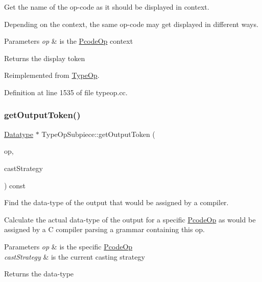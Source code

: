 Get the name of the op-\/code as it should be displayed in context. 

Depending on the context, the same op-\/code may get displayed in different ways. 
\begin{DoxyParams}{Parameters}
{\em op} & is the \mbox{\hyperlink{class_pcode_op}{Pcode\+Op}} context \\
\hline
\end{DoxyParams}
\begin{DoxyReturn}{Returns}
the display token 
\end{DoxyReturn}


Reimplemented from \mbox{\hyperlink{class_type_op_a42a1ffa77f998df24efdb44405b33ac5}{Type\+Op}}.



Definition at line 1535 of file typeop.\+cc.

\mbox{\label{class_type_op_subpiece_ac93ca300b551f16888008869eca39150}} 
\subsubsection{\texorpdfstring{getOutputToken()}{getOutputToken()}}
{\footnotesize\ttfamily \mbox{\hyperlink{class_datatype}{Datatype}} $\ast$ Type\+Op\+Subpiece\+::get\+Output\+Token (\begin{DoxyParamCaption}\item[{const \mbox{\hyperlink{class_pcode_op}{Pcode\+Op}} $\ast$}]{op,  }\item[{\mbox{\hyperlink{class_cast_strategy}{Cast\+Strategy}} $\ast$}]{cast\+Strategy }\end{DoxyParamCaption}) const\hspace{0.3cm}{\ttfamily [virtual]}}



Find the data-\/type of the output that would be assigned by a compiler. 

Calculate the actual data-\/type of the output for a specific \mbox{\hyperlink{class_pcode_op}{Pcode\+Op}} as would be assigned by a C compiler parsing a grammar containing this op. 
\begin{DoxyParams}{Parameters}
{\em op} & is the specific \mbox{\hyperlink{class_pcode_op}{Pcode\+Op}} \\
\hline
{\em cast\+Strategy} & is the current casting strategy \\
\hline
\end{DoxyParams}
\begin{DoxyReturn}{Returns}
the data-\/type 
\end{DoxyReturn}


